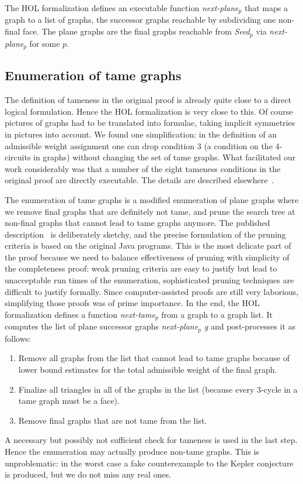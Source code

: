 \documentclass[11pt]{amsart}
\begin{document}
The HOL formalization defines an executable function
\textit{next-plane$_p$} that maps a
graph to a list of graphs, the successor graphs reachable by subdividing one
non-final face.  The plane graphs are the final graphs reachable from
\textit{Seed$_p$} via \textit{next-plane$_p$} for some $p$.

\subsection{Enumeration of tame graphs}

The definition of tameness in the original proof is already quite close to a direct logical
formulation. Hence the HOL formalization is very close to this. Of course
pictures of graphs had to be translated into formulae, taking implicit
symmetries in pictures into account. We found one simplification: in the
definition of an admissible weight assignment one can drop condition 3
(a condition on the $4$-circuits in graphs)
without changing the set of tame graphs. What facilitated our work
considerably was that a number of the eight tameness conditions 
in the original proof are directly
executable. The details are described elsewhere~\cite{NipkowBS-IJCAR06}.

The enumeration of tame graphs is a modified enumeration of plane graphs
where we remove final graphs that are definitely not tame, and prune the
search tree at non-final graphs that cannot lead to tame graphs anymore.  
The published
description~\cite{Hales:2006:DCG} is deliberately sketchy, and 
the precise formulation of the pruning criteria is based on the
original Java programs.  This
is the most delicate part of the proof because we need to balance
effectiveness of pruning with simplicity of the completeness proof: weak
pruning criteria are easy to justify but lead to unacceptable run times of
the enumeration, sophisticated pruning techniques are difficult to justify
formally. Since computer-assisted proofs are still very laborious,
simplifying those proofs was of prime importance. In the end, the HOL
formalization defines a function \textit{next-tame$_p$}
from a graph to a graph list. It computes the list of plane successor graphs
\textit{next-plane$_p$ g} and post-processes it as follows:
\begin{enumerate}
\item Remove all graphs from the list that cannot lead to tame graphs
because of lower bound estimates for the total admissible weight of the final
graph.
\item Finalize all triangles in all of the graphs in the list
(because every 3-cycle in a tame graph must be a face).
\item Remove final graphs that are not tame from the list.
\end{enumerate}
A necessary but possibly not sufficient check for tameness is used in the last
step. Hence the enumeration may actually produce non-tame graphs. This is
unproblematic: in the worst case a fake counterexample to the Kepler
conjecture is produced, but we do not miss any real ones.
\end{document}
